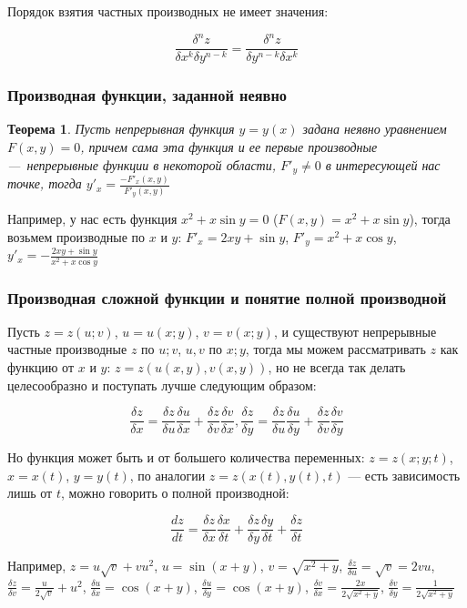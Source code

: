 \documentclass{article}
\newtheorem{theorem}{Теорема}
\begin{document}
Порядок взятия частных производных не имеет значения:

$$\frac{\delta^n z}{\delta x^k \delta y^{n - k}} = \frac{\delta^n z}{\delta y^{n - k} \delta x^{k}}$$

\subsubsection{Производная функции, заданной неявно}

\begin{theorem}
    Пусть непрерывная функция $y = y(x)$ задана неявно уравнением $F(x, y) = 0$, причем сама эта функция и ее первые производные — непрерывные функции в некоторой области, $F'_y \ne 0$ в интересующей нас точке, тогда $y'_x = \frac{-F'_x(x, y)}{F'_y(x, y)}$
\end{theorem}

Например, у нас есть функция $x^2 + x \sin y = 0$ ($F(x, y) = x^2 + x \sin y$), тогда возьмем производные по $x$ и $y$: $F'_x = 2 x y + \sin y$, $F'_y = x^2 + x \cos y$, $y'_x = -\frac{2 x y + \sin y}{x^2 + x \cos y}$

\subsubsection{Производная сложной функции и понятие полной производной}

Пусть $z = z(u; v)$, $u = u(x; y)$, $v = v(x; y)$, и существуют непрерывные частные производные $z$ по $u; v$, $u, v$ по $x; y$, тогда мы можем рассматривать $z$ как функцию от $x$ и $y$: $z = z(u(x, y), v(x, y))$, но не всегда так делать целесообразно и поступать лучше следующим образом:

$$\frac{\delta z}{\delta x} = \frac{\delta z}{\delta u} \frac{\delta u}{\delta x} + \frac{\delta z}{\delta v} \frac{\delta v}{\delta x}, \frac{\delta z}{\delta y} = \frac{\delta z}{\delta u} \frac{\delta u}{\delta y} + \frac{\delta z}{\delta v} \frac{\delta v}{\delta y}$$

Но функция может быть и от большего количества переменных: $z = z(x; y; t)$, $x = x(t)$, $y = y(t)$, по аналогии $z = z(x(t), y(t), t)$ — есть зависимость лишь от $t$, можно говорить о полной производной:

$$
\frac{d z}{d t} = \frac{\delta z}{\delta x} \frac{\delta x}{\delta t} + \frac{\delta z}{\delta y} \frac{\delta y}{\delta t} + \frac{\delta z}{\delta t}
$$

Например, $z = u\sqrt{v} + v u^2$, $u = \sin(x + y)$, $v = \sqrt{x^2 + y}$, $\frac{\delta z}{\delta u} = \sqrt{v} = 2v u$, $\frac{\delta z}{\delta v} = \frac{u}{2 \sqrt{v}} + u^2$, $\frac{\delta u}{\delta x} = \cos (x + y)$, $\frac{\delta u}{\delta y} = \cos (x + y)$, $\frac{\delta v}{\delta x} = \frac{2x}{2\sqrt{x^2 + y}}$, $\frac{\delta v}{\delta y} = \frac{1}{2\sqrt{x^2 + y}}$
\end{document}
